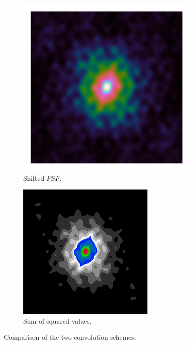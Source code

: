 \begin{figure}[h]
	\centering
	\begin{subfigure}[b]{0.3\linewidth}
		\includegraphics[width=\linewidth]{./chapters/03.cd/simulated/psf.png}
		\caption{Shifted $PSF$.}
		\label{cd:efficient:lipschitz:padded}
	\end{subfigure}
	\begin{subfigure}[b]{0.3\linewidth}
		\includegraphics[width=\linewidth]{./chapters/03.distribution/simulated/psf.png}
		\caption{Sum of squared values.}
		\label{cd:efficient:lipschitz:rectangle}
	\end{subfigure}
	\caption{Comparison of the two convolution schemes.}
	\label{cd:efficient:lipschitz:figure}
\end{figure}

